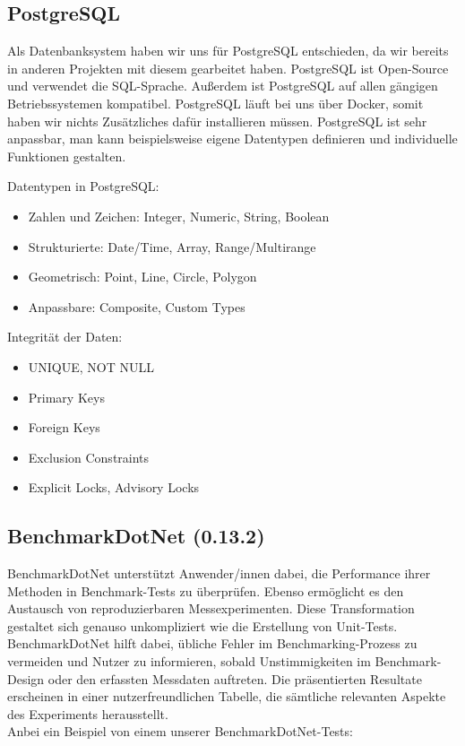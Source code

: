 \subsection*{PostgreSQL}

Als Datenbanksystem haben wir uns für PostgreSQL entschieden, da wir bereits in anderen 
Projekten mit diesem gearbeitet haben. PostgreSQL ist Open-Source und verwendet die SQL-Sprache. 
Außerdem ist PostgreSQL auf allen gängigen Betriebssystemen kompatibel.
PostgreSQL läuft bei uns über Docker, somit haben wir nichts Zusätzliches dafür installieren müssen.
PostgreSQL ist sehr anpassbar, man kann beispielsweise eigene Datentypen 
definieren und individuelle Funktionen gestalten.\\ \cite{postgres}

Datentypen in PostgreSQL:
\begin{itemize}
    \item Zahlen und Zeichen: Integer, Numeric, String, Boolean
    \item Strukturierte: Date/Time, Array, Range/Multirange
    \item Geometrisch: Point, Line, Circle, Polygon
    \item Anpassbare: Composite, Custom Types
\end{itemize}

Integrität der Daten:
\begin{itemize}
    \item UNIQUE, NOT NULL
    \item Primary Keys
    \item Foreign Keys
    \item Exclusion Constraints
    \item Explicit Locks, Advisory Locks
\end{itemize}
\cite{postgres}

\newpage
\subsection*{BenchmarkDotNet (0.13.2)}

BenchmarkDotNet unterstützt Anwender/innen dabei, die Performance ihrer Methoden in 
Benchmark-Tests zu überprüfen. Ebenso ermöglicht es den Austausch von reproduzierbaren 
Messexperimenten. Diese Transformation gestaltet sich genauso unkompliziert wie die 
Erstellung von Unit-Tests. BenchmarkDotNet hilft dabei, übliche Fehler im Benchmarking-Prozess 
zu vermeiden und Nutzer zu informieren, sobald Unstimmigkeiten im Benchmark-Design oder den 
erfassten Messdaten auftreten. Die präsentierten Resultate erscheinen in einer 
nutzerfreundlichen Tabelle, die sämtliche relevanten Aspekte des Experiments herausstellt.\\
Anbei ein Beispiel von einem unserer BenchmarkDotNet-Tests: \cite{benchmark}\\

